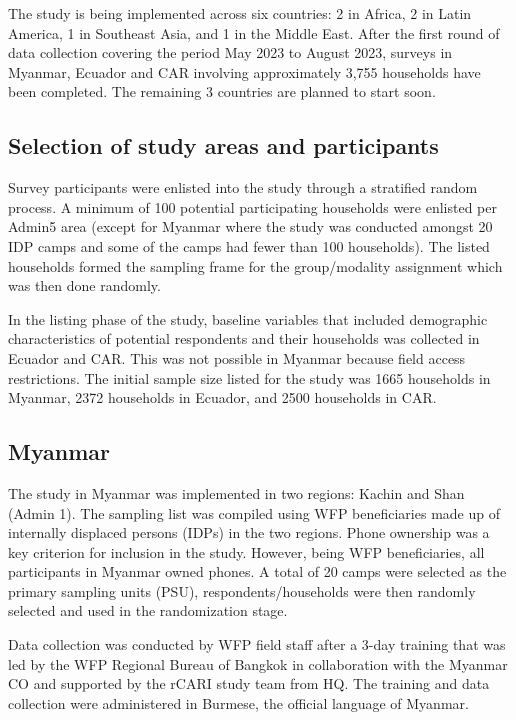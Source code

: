 \documentclass[11pt,harvard]{article}
\begin{document}
The study is being implemented across six countries: 2 in Africa, 2 in Latin America, 1 in Southeast Asia, and 1 in the Middle East. After the first round of data collection covering the period May 2023 to August 2023, surveys in Myanmar, Ecuador and CAR involving approximately 3,755 households have been completed. The remaining 3 countries are planned to start soon.
	
\subsection{Selection of study areas and participants}
	
Survey participants were enlisted into the study through a stratified random process. A minimum of 100 potential participating households were enlisted per Admin5 area (except for Myanmar where the study was conducted amongst 20 IDP camps and some of the camps had fewer than 100 households). The listed households formed the sampling frame for the group/modality assignment which was then done randomly. 
	
In the listing phase of the study, baseline variables that included demographic characteristics of potential respondents and their households was collected in Ecuador and CAR. This was not possible in Myanmar because field access restrictions. The initial sample size listed for the study was 1665 households in Myanmar, 2372 households in Ecuador, and 2500 households in CAR. 
	
	
\subsection{Myanmar}
	
The study in Myanmar was implemented in two regions: Kachin and Shan (Admin 1). The sampling list was compiled using WFP beneficiaries made up of internally displaced persons (IDPs) in the two regions. Phone ownership was a key criterion for inclusion in the study. However, being WFP beneficiaries, all participants in Myanmar owned phones. A total of 20 camps were selected as the primary sampling units (PSU), respondents/households were then randomly selected and used in the randomization stage.

Data collection was conducted by WFP field staff after a 3-day training that was led by the WFP Regional Bureau of Bangkok in collaboration with the Myanmar CO and supported by the rCARI study team from HQ.  The training and data collection were administered in Burmese, the official language of Myanmar. 
\end{document}
